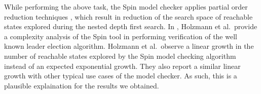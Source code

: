 \documentclass[journal, compsoc]{IEEEtran}
\begin{document}
	While performing the above task, the Spin model checker  applies partial order reduction techniques \cite{Peled1994}, which result in reduction of the search space of reachable states explored during the nested depth first search. In  \cite{Holzmann:1997:MCS:260897.260902}, Holzmann et al.\ provide a complexity analysis of the Spin tool in performing verification of the well known leader election algorithm. Holzmann et al.\ observe a linear growth in the number of reachable states explored by the Spin model checking algorithm instead of an expected exponential growth. They also report a similar linear growth with other typical use cases of the model checker. As such, this is a plausible explaination for the results we obtained.  
	
	
	
\end{document}
